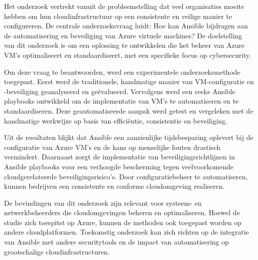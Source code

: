 Het onderzoek vertrekt vanuit de probleemstelling dat veel organisaties moeite hebben om hun cloudinfrastructuur op een consistente en veilige manier te configureren.
De centrale onderzoeksvraag luidt: Hoe kan Ansible bijdragen aan de automatisering en beveiliging van Azure virtuele machines?
De doelstelling van dit onderzoek is om een oplossing te ontwikkelen die het beheer van Azure VM's optimaliseert en standaardiseert, met een specifieke focus op cybersecurity.

Om deze vraag te beantwoorden, werd een experimentele onderzoeksmethode toegepast.
Eerst werd de traditionele, handmatige manier van VM-configuratie en -beveiliging geanalyseerd en geëvalueerd.
Vervolgens werd een reeks Ansible playbooks ontwikkeld om de implementatie van VM's te automatiseren en te standaardiseren.
Deze geautomatiseerde aanpak werd getest en vergeleken met de handmatige werkwijze op basis van efficiëntie, consistentie en beveiliging.

Uit de resultaten blijkt dat Ansible een aanzienlijke tijdsbesparing oplevert bij de configuratie van Azure VM's en de kans op menselijke fouten drastisch vermindert.
Daarnaast zorgt de implementatie van beveiligingsrichtlijnen in Ansible playbooks voor een verhoogde bescherming tegen veelvoorkomende cloudgerelateerde beveiligingsrisico's.
Door configuratiebeheer te automatiseren, kunnen bedrijven een consistente en conforme cloudomgeving realiseren.

De bevindingen van dit onderzoek zijn relevant voor systeem- en netwerkbeheerders die cloudomgevingen beheren en optimaliseren.
Hoewel de studie zich toespitst op Azure, kunnen de methoden ook toegepast worden op andere cloudplatformen.
Toekomstig onderzoek kan zich richten op de integratie van Ansible met andere securitytools en de impact van automatisering op grootschalige cloudinfrastructuren.
